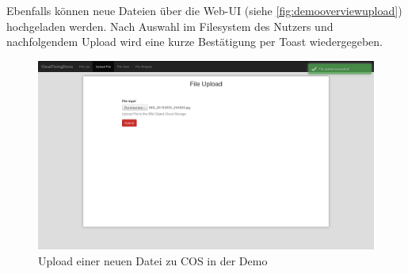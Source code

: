Ebenfalls können neue Dateien über die Web-UI (siehe \autoref{fig:demooverviewupload}) hochgeladen werden. Nach Auswahl im Filesystem des Nutzers und nachfolgendem Upload wird eine kurze Bestätigung per Toast wiedergegeben.
\begin{figure}[hbt]
	\centering
	\includegraphics[scale=0.25]{images/demo-overview-upload}
	\caption{Upload einer neuen Datei zu COS in der Demo}
	\label{fig:demooverviewupload}
\end{figure}